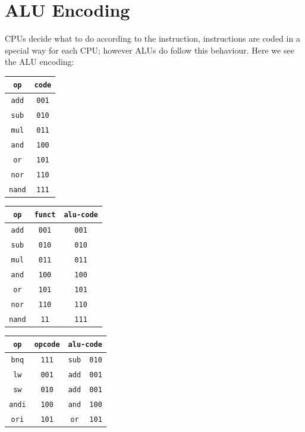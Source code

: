 \documentclass[12pt, dvipsnames, svgnames, x11names, oneside]{book}
\begin{document}
\section{ALU Encoding}\label{sec:alu-encode}
CPUs decide what to do according to the instruction, instructions are coded in a special way for each CPU; however ALUs do follow this behaviour. Here we see the ALU encoding:

\begin{table}[H]
\begin{adjustbox}{width=\textwidth}
\begin{tabular}{|c|c|}
\hline
\texttt{op} & \texttt{code} \\
\hline
\hline
\texttt{add} & \texttt{001} \\
\hline
\texttt{sub} & \texttt{010} \\
\hline
\texttt{mul} & \texttt{011} \\
\hline
\texttt{and} & \texttt{100} \\
\hline
\texttt{or} & \texttt{101} \\
\hline
\texttt{nor} & \texttt{110} \\
\hline
\texttt{nand} & \texttt{111} \\
\hline
\end{tabular}
\begin{tabular}{|c|c|c|}
\hline
\texttt{op} & \texttt{funct} & \texttt{alu-code} \\
\hline
\hline
\texttt{add} & \texttt{001} & \texttt{001} \\
\hline
\texttt{sub} & \texttt{010} & \texttt{010} \\
\hline
\texttt{mul} & \texttt{011} & \texttt{011} \\
\hline
\texttt{and} & \texttt{100} & \texttt{100} \\
\hline
\texttt{or} & \texttt{101} & \texttt{101} \\
\hline
\texttt{nor} & \texttt{110} & \texttt{110} \\
\hline
\texttt{nand} & \texttt{11} & \texttt{111} \\
\hline
\end{tabular}
\begin{tabular}{|c|c|c|c|}
\hline
\texttt{op} & \texttt{opcode} & \multicolumn{2}{|c|}{\texttt{alu-code}} \\
\hline
\hline
\texttt{bnq} & \texttt{111} & \texttt{sub} & \texttt{010} \\
\hline
\texttt{lw} & \texttt{001} & \texttt{add} & \texttt{001} \\
\hline
\texttt{sw} & \texttt{010} & \texttt{add} & \texttt{001} \\
\hline
\texttt{andi} & \texttt{100} & \texttt{and} & \texttt{100} \\
\hline
\texttt{ori} & \texttt{101} & \texttt{or} & \texttt{101} \\
\hline
\end{tabular}
\end{adjustbox}
\end{table}
\end{document}
